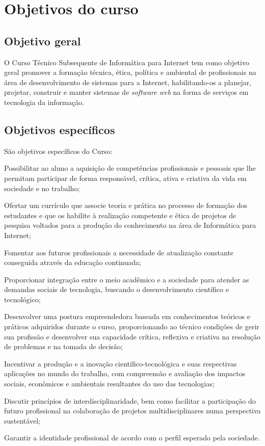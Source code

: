\documentclass[
	12pt,				%
	openright,			%
	twoside,			%
	a4paper,			%
	chapter=TITLE,		%
	english,			%
	french,				%
	spanish,			%
	brazil,				%
	]{abntex2}
\begin{document}
\chapter{Objetivos do curso}

\section{Objetivo geral}


O Curso Técnico Subsequente de Informática para Internet tem como objetivo geral promover a formação técnica, ética, política e ambiental de profissionais na área de desenvolvimento de sistemas para a Internet, habilitando-os a planejar, projetar, construir e manter sistemas de \textit{software web} na forma de serviços em tecnologia da informação.


\section{Objetivos específicos}

São objetivos específicos do Curso:
\begin{alineas}
    \item Possibilitar ao aluno a aquisição de competências profissionais e pessoais que lhe permitam participar de forma responsável, crítica, ativa e criativa da vida em sociedade e no trabalho;
    \item  Ofertar um currículo que associe teoria e prática no processo de formação dos estudantes e que os habilite à realização competente e ética de projetos de pesquisa voltados para a produção do conhecimento na área de Informática para Internet;
    \item  Fomentar aos futuros profissionais a necessidade de atualização constante conseguida através da educação continuada;
    \item  Proporcionar integração entre o meio acadêmico e a sociedade para atender as demandas sociais de tecnologia, buscando o desenvolvimento científico e tecnológico;
    \item  Desenvolver uma postura empreendedora baseada em conhecimentos teóricos e práticos adquiridos durante o curso, proporcionando ao técnico condições de gerir sua profissão e desenvolver sua capacidade crítica, reflexiva e criativa na resolução de problemas e na tomada de decisão;
    \item  Incentivar a produção e a inovação científico-tecnológica e suas respectivas aplicações no mundo do trabalho, com compreensão e avaliação dos impactos sociais, econômicos e ambientais resultantes do uso das tecnologias;
    \item Discutir  princípios de interdisciplinaridade, bem como facilitar a participação do futuro profissional na colaboração de projetos multidisciplinares numa perspectiva sustentável;
    \item Garantir a identidade profissional de acordo com o perfil esperado pela sociedade.
\end{alineas}
\end{document}
